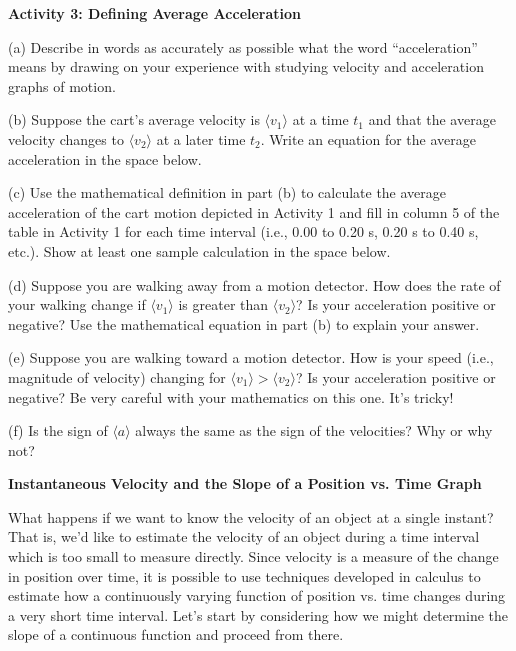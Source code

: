 \textbf{Activity 3: Defining Average Acceleration }

(a) Describe in words as accurately as possible what the word ``acceleration''
means by drawing on your experience with studying velocity and acceleration
graphs of motion.
\answerspace{20mm}

(b) Suppose the cart's average velocity is $\langle v_{1}\rangle$
at a time \( t_{1} \)
and that the average velocity changes to $\langle v_2\rangle$
at a later time \( t_{2} \).
Write an equation for the average acceleration in the space below. 
\answerspace{20mm}

\pagebreak[2]
(c) Use the mathematical definition in part (b) to calculate the average acceleration
of the cart motion depicted in Activity 1 and fill in column 5 of the table
in Activity 1 for each time interval (i.e., 0.00 to 0.20 s, 0.20 s to 0.40 s,
etc.). Show at least one sample calculation in the space below.
\answerspace{20mm}

(d) Suppose you are walking away from a motion detector. How does the rate of
your walking change if $\langle v_{1}\rangle$ is greater than 
$\langle v_{2}\rangle$? Is your
acceleration positive or negative? Use the mathematical equation in part (b)
to explain your answer. 
\vspace{20mm}

(e) Suppose you are walking toward a motion detector. How is your speed (i.e.,
magnitude of velocity) changing for 
$\langle v_{1}\rangle > \langle v_{2} \rangle$? Is your
acceleration positive or negative? Be very careful with your mathematics on
this one. It's tricky!
\vspace{20mm}

(f) Is the sign of $\langle a\rangle$
always the same as the sign of the velocities? Why or
why not?
\vspace{20mm}

\textbf{Instantaneous Velocity and the Slope of a Position vs. Time Graph} 

What happens if we want to know the velocity of an object at a single instant?
That is, we'd like to estimate the velocity of an object during a time interval
which is too small to measure directly. Since velocity is a measure of the change
in position over time, it is possible to use techniques developed in calculus
to estimate how a continuously varying function of position vs. time changes
during a very short time interval. Let's start by considering how we might determine
the slope of a continuous function and proceed from there.


